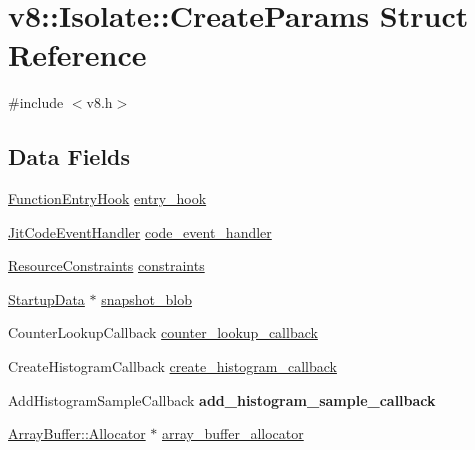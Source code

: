 \hypertarget{structv8_1_1Isolate_1_1CreateParams}{}\section{v8\+:\+:Isolate\+:\+:Create\+Params Struct Reference}
\label{structv8_1_1Isolate_1_1CreateParams}


{\ttfamily \#include $<$v8.\+h$>$}

\subsection*{Data Fields}
\begin{DoxyCompactItemize}
\item 
\hyperlink{namespacev8_aaf07fb6bb13f295da3c6568938b7dec5}{Function\+Entry\+Hook} \hyperlink{structv8_1_1Isolate_1_1CreateParams_aa7aa18bbe2d86713e5b074a93b38dc60}{entry\+\_\+hook}
\item 
\hyperlink{namespacev8_a39243bc91e63d64d111452fdb98c4733}{Jit\+Code\+Event\+Handler} \hyperlink{structv8_1_1Isolate_1_1CreateParams_a783e3eba90ce6e2800bdd69197bbccdd}{code\+\_\+event\+\_\+handler}
\item 
\hyperlink{classv8_1_1ResourceConstraints}{Resource\+Constraints} \hyperlink{structv8_1_1Isolate_1_1CreateParams_a2c570b306aa8c1c24cfe70e8eee50fa1}{constraints}
\item 
\hyperlink{classv8_1_1StartupData}{Startup\+Data} $\ast$ \hyperlink{structv8_1_1Isolate_1_1CreateParams_a25d38476e4dec79ae96c59292eee4a64}{snapshot\+\_\+blob}
\item 
Counter\+Lookup\+Callback \hyperlink{structv8_1_1Isolate_1_1CreateParams_a10441abadd0b83a938303c92e7444fb6}{counter\+\_\+lookup\+\_\+callback}
\item 
Create\+Histogram\+Callback \hyperlink{structv8_1_1Isolate_1_1CreateParams_a11acf5fb9cdbc4c8bf15baf542507b49}{create\+\_\+histogram\+\_\+callback}
\item 
Add\+Histogram\+Sample\+Callback {\bfseries add\+\_\+histogram\+\_\+sample\+\_\+callback}\hypertarget{structv8_1_1Isolate_1_1CreateParams_a3e0fb886996eb1f498b6cc157e11e280}{}\label{structv8_1_1Isolate_1_1CreateParams_a3e0fb886996eb1f498b6cc157e11e280}

\item 
\hyperlink{classv8_1_1ArrayBuffer_1_1Allocator}{Array\+Buffer\+::\+Allocator} $\ast$ \hyperlink{structv8_1_1Isolate_1_1CreateParams_a7c663f70b64290392eeaf164f57585f9}{array\+\_\+buffer\+\_\+allocator}
\end{DoxyCompactItemize}



